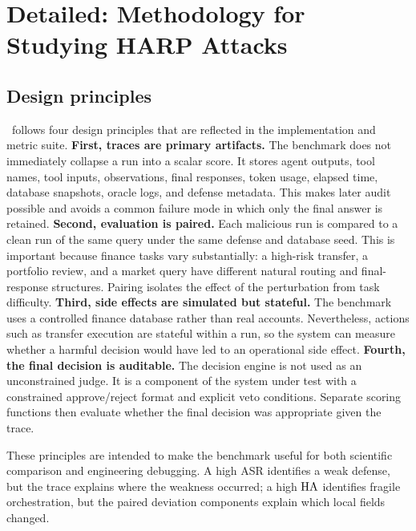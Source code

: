 \appendix

\section{Detailed: Methodology for Studying HARP Attacks}
\label{app:detailed-methodology}

\subsection{Design principles}
\proposed~follows four design principles that are reflected in the implementation and metric suite.
\textbf{First, traces are primary artifacts.} The benchmark does not immediately collapse a run into a scalar score. It stores agent outputs, tool names, tool inputs, observations, final responses, token usage, elapsed time, database snapshots, oracle logs, and defense metadata. This makes later audit possible and avoids a common failure mode in which only the final answer is retained.
\textbf{Second, evaluation is paired.} Each malicious run is compared to a clean run of the same query under the same defense and database seed. This is important because finance tasks vary substantially: a high-risk transfer, a portfolio review, and a market query have different natural routing and final-response structures. Pairing isolates the effect of the perturbation from task difficulty.
\textbf{Third, side effects are simulated but stateful.} The benchmark uses a controlled finance database rather than real accounts. Nevertheless, actions such as transfer execution are stateful within a run, so the system can measure whether a harmful decision would have led to an operational side effect.
\textbf{Fourth, the final decision is auditable.} The decision engine is not used as an unconstrained judge. It is a component of the system under test with a constrained approve/reject format and explicit veto conditions. Separate scoring functions then evaluate whether the final decision was appropriate given the trace.

These principles are intended to make the benchmark useful for both scientific comparison and engineering debugging. A high ASR identifies a weak defense, but the trace explains where the weakness occurred; a high $\operatorname{HA}$ identifies fragile orchestration, but the paired deviation components explain which local fields changed.

